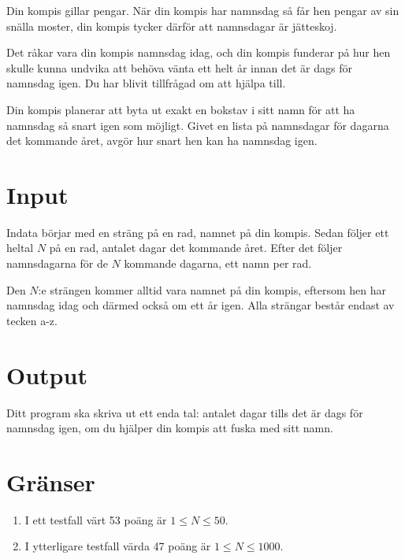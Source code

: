 
Din kompis gillar pengar. När din kompis har namnsdag så får hen pengar av sin snälla moster,
din kompis tycker därför att namnsdagar är jätteskoj.

Det råkar vara din kompis namnsdag idag, och din kompis funderar på hur hen skulle kunna
undvika att behöva vänta ett helt år innan det är dags för namnsdag igen. Du har blivit tillfrågad
om att hjälpa till.

Din kompis planerar att byta ut exakt en bokstav i sitt namn för att ha namnsdag så
snart igen som möjligt. Givet en lista på namnsdagar för dagarna det kommande
året, avgör hur snart hen kan ha namnsdag igen.

\section*{Input}
Indata börjar med en sträng på en rad, namnet på din kompis.
Sedan följer ett heltal $N$ på en rad, antalet dagar det kommande året.
Efter det följer namnsdagarna för de $N$ kommande dagarna, ett namn per rad.

Den $N$:e strängen kommer alltid vara namnet på din kompis,
eftersom hen har namnsdag idag och därmed också om ett år igen. Alla strängar
består endast av tecken a-z.

\section*{Output}
Ditt program ska skriva ut ett enda tal: antalet dagar tills det är dags för
namnsdag igen, om du hjälper din kompis att fuska med sitt namn.

\section*{Gränser}

\begin{enumerate}
\item I ett testfall värt 53 poäng är $1 \le N \le 50$.
\item I ytterligare testfall värda 47 poäng är $1 \le N \le 1000$.
\end{enumerate}

